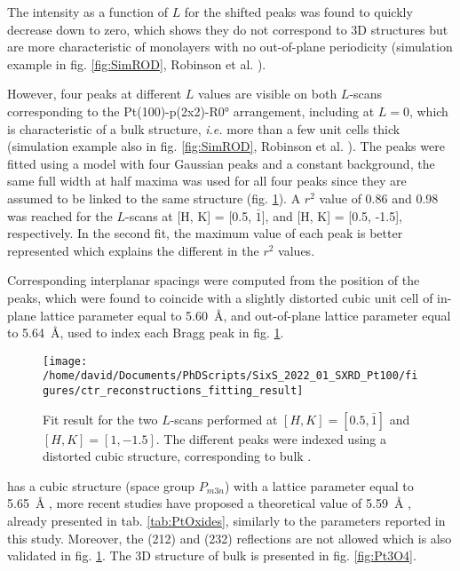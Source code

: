 The intensity as a function of $L$ for the shifted peaks was found to quickly decrease down to zero, which shows they do not correspond to 3D structures but are more characteristic of monolayers with no out-of-plane periodicity (simulation example in fig. \ref{fig:SimROD}, Robinson et al. \cite*{Robinson1991}).

However, four peaks at different $L$ values are visible on both $L$-scans corresponding to the Pt(100)-p(2x2)-R\ang{0} arrangement, including at $L=0$, which is characteristic of a bulk structure, \textit{i.e.} more than a few unit cells thick (simulation example also in fig. \ref{fig:SimROD}, Robinson et al. \cite*{Robinson1991}).
The peaks were fitted using a model with four Gaussian peaks and a constant background, the same full width at half maxima was used for all four peaks since they are assumed to be linked to the same structure (fig. \ref{fig:FitPt100LScans}).
A $r^2$ value of \num{0.86} and \num{0.98} was reached for the $L$-scans at [H, K] = [0.5, $\bar{1}$], and [H, K] = [0.5, -1.5], respectively.
In the second fit, the maximum value of each peak is better represented which explains the different in the $r^2$ values.

Corresponding interplanar spacings were computed from the position of the peaks, which were found to coincide with a slightly distorted cubic unit cell of in-plane lattice parameter equal to \qty{5.60}{\angstrom}, and out-of-plane lattice parameter equal to \qty{5.64}{\angstrom}, used to index each Bragg peak in fig. \ref{fig:FitPt100LScans}.

\begin{figure}[!htb]
    \centering
    \texttt{[image: /home/david/Documents/PhDScripts/SixS\_2022\_01\_SXRD\_Pt100/figures/ctr\_reconstructions\_fitting\_result]}
    \caption{
        Fit result for the two $L$-scans performed at $[H, K] = [0.5, \bar{1}]$ and $[H, K] = [1, -1.5]$.
        The different peaks were indexed using a distorted cubic structure, corresponding to bulk .
    }
    \label{fig:FitPt100LScans}
\end{figure}

 has a cubic structure (space group $P_{m3n}$) with a lattice parameter equal to \qty{5.65}{\angstrom} \parencite{Galloni1941, Galloni1952, Muller1968}, more recent studies have proposed a theoretical value of \qty{5.59}{\angstrom} \parencite{Seriani2006}, already presented in tab. \ref{tab:PtOxides}, similarly to the parameters reported in this study.
Moreover, the (212) and (232) reflections are not allowed which is also validated in fig. \ref{fig:FitPt100LScans}.
The 3D structure of bulk  is presented in fig. \ref{fig:Pt3O4}.

